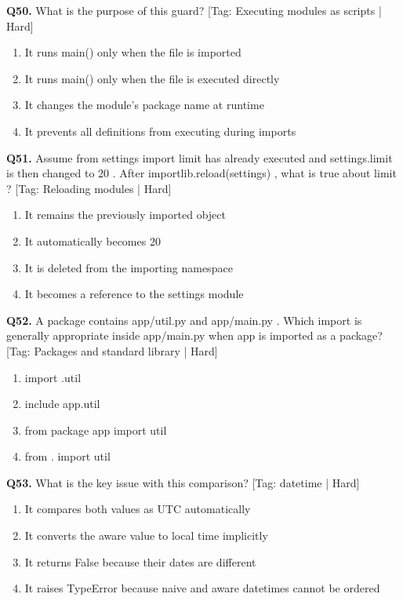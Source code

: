 \vspace{2mm}
\noindent\textbf{Q50.} What is the purpose of this guard? \hfill [Tag: Executing modules as scripts | Hard]
\begin{enumerate}[label=(\alph*),topsep=2pt,itemsep=1pt,partopsep=0pt,parsep=0pt]
    \item {It runs main() only when the file is imported}
    \item {It runs main() only when the file is executed directly}
    \item {It changes the module's package name at runtime}
    \item {It prevents all definitions from executing during imports}
\end{enumerate}
\vspace{2mm}
\noindent\textbf{Q51.} Assume from settings import limit has already executed and settings.limit is then changed to 20 . After importlib.reload(settings) , what is true about limit ? \hfill [Tag: Reloading modules | Hard]
\begin{enumerate}[label=(\alph*),topsep=2pt,itemsep=1pt,partopsep=0pt,parsep=0pt]
    \item {It remains the previously imported object}
    \item {It automatically becomes 20}
    \item {It is deleted from the importing namespace}
    \item {It becomes a reference to the settings module}
\end{enumerate}
\vspace{2mm}
\noindent\textbf{Q52.} A package contains app/util.py and app/main.py . Which import is generally appropriate inside app/main.py when app is imported as a package? \hfill [Tag: Packages and standard library | Hard]
\begin{enumerate}[label=(\alph*),topsep=2pt,itemsep=1pt,partopsep=0pt,parsep=0pt]
    \item {import .util}
    \item {include app.util}
    \item {from package app import util}
    \item {from . import util}
\end{enumerate}
\vspace{2mm}
\noindent\textbf{Q53.} What is the key issue with this comparison? \hfill [Tag: datetime | Hard]
\begin{enumerate}[label=(\alph*),topsep=2pt,itemsep=1pt,partopsep=0pt,parsep=0pt]
    \item {It compares both values as UTC automatically}
    \item {It converts the aware value to local time implicitly}
    \item {It returns False because their dates are different}
    \item {It raises TypeError because naive and aware datetimes cannot be ordered}
\end{enumerate}
